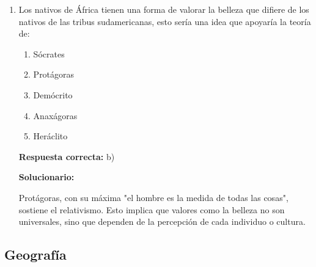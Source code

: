 \begin{enumerate}[resume]
	\vspace{2mm}
	\textbf{Solucionario:}

	La ética estoica propone que la felicidad se alcanza a través de la "apatheia" y la aceptación del orden racional del universo. Aceptar lo que uno es y lo que le acontece (el destino) permite vivir en armonía con la naturaleza y alcanzar la tranquilidad del alma.

	\vspace{6mm}

	\item Los nativos de África tienen una forma de valorar la belleza que difiere de los nativos de las tribus sudamericanas, esto sería una idea que apoyaría la teoría de:
	\begin{enumerate}[label=\alph*)]
		\item Sócrates
		\item Protágoras
		\item Demócrito
		\item Anaxágoras
		\item Heráclito
	\end{enumerate}
	\textbf{Respuesta correcta:} b)

	\vspace{2mm}
	\textbf{Solucionario:}

	Protágoras, con su máxima "el hombre es la medida de todas las cosas", sostiene el relativismo. Esto implica que valores como la belleza no son universales, sino que dependen de la percepción de cada individuo o cultura.

	\vspace{6mm}

\end{enumerate}


\subsection*{Geografía}

